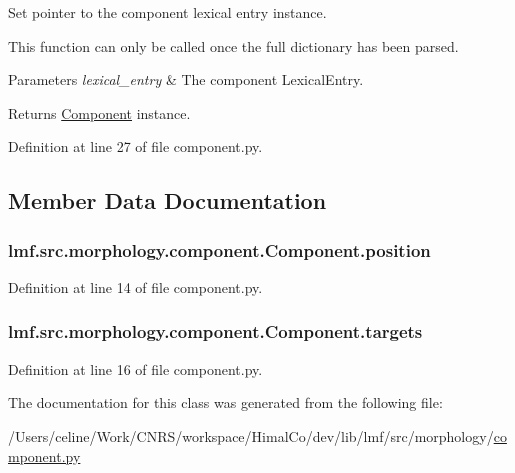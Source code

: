 Set pointer to the component lexical entry instance. 

This function can only be called once the full dictionary has been parsed. 
\begin{DoxyParams}{Parameters}
{\em lexical\+\_\+entry} & The component Lexical\+Entry. \\
\hline
\end{DoxyParams}
\begin{DoxyReturn}{Returns}
\hyperlink{classlmf_1_1src_1_1morphology_1_1component_1_1_component}{Component} instance. 
\end{DoxyReturn}


Definition at line 27 of file component.\+py.



\subsection{Member Data Documentation}
\hypertarget{classlmf_1_1src_1_1morphology_1_1component_1_1_component_ad4f8453c7d8bd58fe8d364b363067b2a}{
\subsubsection[{position}]{\setlength{\rightskip}{0pt plus 5cm}lmf.\+src.\+morphology.\+component.\+Component.\+position}}\label{classlmf_1_1src_1_1morphology_1_1component_1_1_component_ad4f8453c7d8bd58fe8d364b363067b2a}


Definition at line 14 of file component.\+py.

\hypertarget{classlmf_1_1src_1_1morphology_1_1component_1_1_component_a90de1db1e2438bbbcd08cccbe07ad1ea}{
\subsubsection[{targets}]{\setlength{\rightskip}{0pt plus 5cm}lmf.\+src.\+morphology.\+component.\+Component.\+targets}}\label{classlmf_1_1src_1_1morphology_1_1component_1_1_component_a90de1db1e2438bbbcd08cccbe07ad1ea}


Definition at line 16 of file component.\+py.



The documentation for this class was generated from the following file\+:\begin{DoxyCompactItemize}
\item 
/\+Users/celine/\+Work/\+C\+N\+R\+S/workspace/\+Himal\+Co/dev/lib/lmf/src/morphology/\hyperlink{component_8py}{component.\+py}\end{DoxyCompactItemize}
